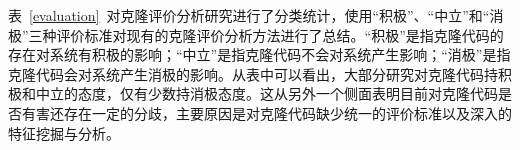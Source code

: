 
表~\ref{evaluation}~对克隆评价分析研究进行了分类统计，使用“积极”、“中立”和“消极”三种评价标准对现有的克隆评价分析方法进行了总结。“积极”是指克隆代码的存在对系统有积极的影响；“中立”是指克隆代码不会对系统产生影响；“消极”是指克隆代码会对系统产生消极的影响。从表中可以看出，大部分研究对克隆代码持积极和中立的态度，仅有少数持消极态度。这从另外一个侧面表明目前对克隆代码是否有害还存在一定的分歧，主要原因是对克隆代码缺少统一的评价标准以及深入的特征挖掘与分析。%

